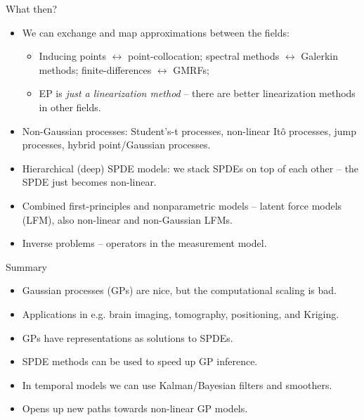 \documentclass[first=dgreen,second=purple,presentation]{elecslides}
\begin{document}
\begin{frame}{What then?}

\begin{itemize}[<+->]
\item We can \alert{exchange and map approximations} between the fields:
\begin{itemize}[<+->]
\item Inducing points $\leftrightarrow$ point-collocation; spectral methods $\leftrightarrow$ Galerkin methods; finite-differences $\leftrightarrow$ GMRFs;
\item EP is {\em just a linearization method} -- there are better linearization methods in other fields.
\end{itemize}
\item \alert{Non-Gaussian} processes: Student's-t processes, non-linear It\^o processes, jump processes, hybrid point/Gaussian processes.
\item \alert{Hierarchical} (deep) \alert{SPDE models}: we \alert{stack SPDEs} on top of each other -- the SPDE just becomes non-linear.
\item \alert{Combined first-principles} and nonparametric models -- latent force models (LFM), also non-linear and non-Gaussian LFMs.
\item \alert{Inverse problems} -- operators in the measurement model.
\end{itemize}

\end{frame}

\begin{frame}{Summary}
\begin{itemize}[<+->]
\item Gaussian processes (GPs) are nice, \alert{but the computational scaling is bad.}
\item Applications in e.g. \alert{brain imaging, tomography, positioning, and Kriging}.
\item GPs have representations as \alert{solutions to SPDEs}.
\item SPDE methods can be used to \alert{speed up GP inference}.
\item In temporal models we can use \alert{Kalman/Bayesian filters and smoothers}.
\item Opens up new paths towards \alert{non-linear GP models}.
\end{itemize}
\end{frame}


\end{document}

